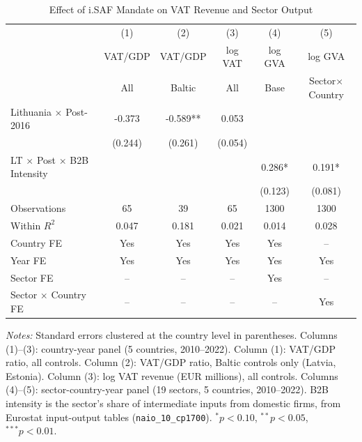 \begin{table}[t]
\centering
\caption{Effect of i.SAF Mandate on VAT Revenue and Sector Output}
\label{tab:main}
\small
\begin{tabular}{lccccc}
\hline\hline
 & (1) & (2) & (3) & (4) & (5) \\
 & VAT/GDP & VAT/GDP & log VAT & log GVA & log GVA \\
 & All & Baltic & All & Base & Sector$\times$Country \\
\hline
Lithuania $\times$ Post-2016 & -0.373 & -0.589** & 0.053 & & \\
 & (0.244) & (0.261) & (0.054) & & \\
LT $\times$ Post $\times$ B2B Intensity & & & & 0.286* & 0.191* \\
 & & & & (0.123) & (0.081) \\
\hline
Observations & 65 & 39 & 65 & 1300 & 1300 \\
Within $R^2$ & 0.047 & 0.181 & 0.021 & 0.014 & 0.028 \\
Country FE & Yes & Yes & Yes & Yes & -- \\
Year FE & Yes & Yes & Yes & Yes & Yes \\
Sector FE & -- & -- & -- & Yes & -- \\
Sector $\times$ Country FE & -- & -- & -- & -- & Yes \\
\hline\hline
\end{tabular}
\begin{tablenotes}
\item \textit{Notes:} Standard errors clustered at the country level in parentheses. Columns (1)--(3): country-year panel (5 countries, 2010--2022). Column (1): VAT/GDP ratio, all controls. Column (2): VAT/GDP ratio, Baltic controls only (Latvia, Estonia). Column (3): log VAT revenue (EUR millions), all controls. Columns (4)--(5): sector-country-year panel (19 sectors, 5 countries, 2010--2022). B2B intensity is the sector's share of intermediate inputs from domestic firms, from Eurostat input-output tables (\texttt{naio\_10\_cp1700}). $^{*}p<0.10$, $^{**}p<0.05$, $^{***}p<0.01$.
\end{tablenotes}
\end{table}
